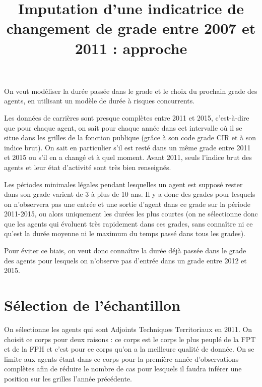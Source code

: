 \documentclass[11pt,a4paper]{article}
\begin{document}
\title{Imputation d'une indicatrice de changement de grade entre 2007 et 2011 : approche}


\author{}


\maketitle

On veut modéliser la durée passée dans le grade et le choix du prochain grade des agents, en utilisant un modèle de durée à risques concurrents. \bigskip

Les données de carrières sont presque complètes entre 2011 et 2015, c'est-à-dire que pour chaque agent, on sait pour chaque année dans cet intervalle où il se situe dans les grilles de la fonction publique (grâce à son code grade CIR et à son indice brut). On sait en particulier s'il est resté dans un même grade entre 2011 et 2015 ou s'il en a changé et à quel moment. Avant 2011, seuls l'indice brut des agents et leur état d'activité sont très bien renseignés. \bigskip

Les périodes minimales légales pendant lesquelles un agent est supposé rester dans son grade varient de 3 à plus de 10 ans. Il y a donc des grades pour lesquels on n'observera pas une entrée et une sortie d'agent dans ce grade sur la période 2011-2015, ou alors uniquement les durées les plus courtes (on ne sélectionne donc que les agents qui évoluent très rapidement dans ces grades, sans connaître ni ce qu'est la durée moyenne ni le maximum du temps passé dans tous les grades).\bigskip


Pour éviter ce biais, on veut donc connaître la durée déjà passée dans le grade des agents pour lesquels on n'observe pas d'entrée dans un grade entre 2012 et 2015.

\section{Sélection de l'échantillon}

On sélectionne les agents qui sont Adjoints Techniques Territoriaux en 2011. On choisit ce corps pour deux raisons : ce corps est le corps le plus peuplé de la FPT et de la FPH et c'est pour ce corps qu'on a la meilleure qualité de donnée. On se limite aux agents étant dans ce corps pour la première année d'observations complètes afin de réduire le nombre de cas pour lesquels il faudra inférer une position sur les grilles l'année précédente. \bigskip
\end{document}
